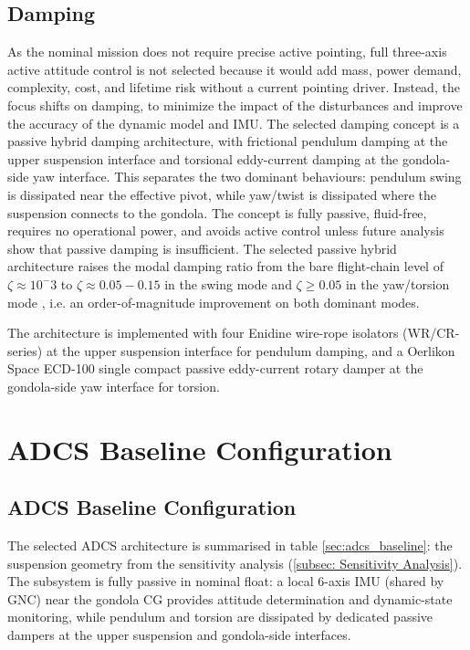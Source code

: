 \subsection{Damping}
\label{subsec: Damping}
As the nominal mission does not require precise active pointing, full three-axis active attitude control is not selected because it would add mass, power demand, complexity, cost, and lifetime risk without a current pointing driver. Instead, the focus shifts on damping, to minimize the impact of the disturbances and improve the accuracy of the dynamic model and IMU. The selected damping concept is a passive hybrid damping architecture, with frictional pendulum damping at the upper suspension interface and torsional eddy-current damping at the gondola-side yaw interface. This separates the two dominant behaviours: pendulum swing is dissipated near the effective pivot, while yaw/twist is dissipated where the suspension connects to the gondola. The concept is fully passive, fluid-free, requires no operational power, and avoids active control unless future analysis show that passive damping is insufficient. The selected passive hybrid architecture raises the modal damping ratio from the bare flight-chain level of $\zeta \approx  10^-3$ \cite{Kassarian2021BalloonDynamics, Aubin2017TorsionalOscillations} to $\zeta \approx 0.05-0.15$ in the swing mode \cite{NASA_LLIS_19101} and $\zeta \geq 0.05$ in the yaw/torsion mode \cite{DiezJimenez2019PassiveEM}, i.e. an order-of-magnitude improvement on both dominant modes.

The architecture is implemented with four Enidine wire-rope isolators (WR/CR-series) \cite{EnidineWRI} at the upper suspension interface  for pendulum damping, and a Oerlikon Space ECD-100  \cite{Hofer2009WireRope} single compact passive eddy-current rotary damper at the gondola-side yaw interface for torsion.

\section{ADCS Baseline Configuration}
\subsection{ADCS Baseline Configuration}
\label{sec:adcs_baseline}

The selected ADCS architecture is summarised in table \autoref{sec:adcs_baseline}: the suspension geometry from the sensitivity analysis (\autoref{subsec: Sensitivity Analysis}). The subsystem is fully passive in nominal float: a  local 6-axis IMU (shared by GNC) near the gondola CG provides attitude determination and dynamic-state monitoring, while pendulum and torsion are dissipated by dedicated passive dampers at the upper suspension and gondola-side interfaces.

